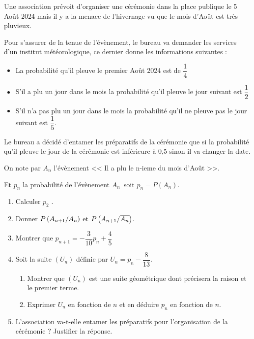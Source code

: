 \begin{exercice}
Une association prévoit d'organiser une cérémonie dans la place publique
le 5 Août 2024 mais il y a la menace de l'hivernage vu que le mois d'Août
est très pluvieux.

Pour s'assurer de la tenue de l'évènement, le bureau va demander les
services d'un institut météorologique, ce dernier donne les informations
suivantes :
\begin{itemize}
\item La probabilité qu'il pleuve le premier Août 2024 est de  $ \dfrac{1}{4} $
\item S'il a plu un jour dans le mois la probabilité qu'il pleuve le jour suivant est $ \dfrac{1}{2} $
\item S’il n'a pas plu un jour dans le mois la probabilité qu’il ne pleuve pas
le jour suivant est $ \dfrac{1}{5} $.
\end{itemize}
Le bureau a décidé d'entamer les préparatifs de la cérémonie que si la
probabilité qu'il pleuve le jour de la cérémonie est inférieure à 0,5 sinon il va
changer la date.

\noindent On note par $ A_n $ l'évènement << Il a plu le n-ieme du mois d'Août >>.

\noindent Et  $ p_n $ la probabilité de l'évènement \; $ A_n $\, soit   $p_n=P(A_n)$.
\begin{enumerate}
\item Calculer $ p_2 $ .
\item  Donner \; $ P \left(A_{n+1} /A_{n}\right) $\;  et \; $ P \left(A_{n+1} /\overline{A_{n}}\right) $.
\item Montrer que \; $ p_{n+1}=-\dfrac{3}{10}p_n +\dfrac{4}{5}$
\item Soit la suite $(U_  n)$ définie par  $U_n=p_n -\dfrac{8}{13}$.
\begin{enumerate}
\item Montrer que $(U_  n)$ est une suite géométrique dont précisera la raison et
le premier terme.
\item Exprimer $U_n$ en fonction de $n$ et en déduire $p_n$ en fonction de $n$.
\end{enumerate}
\item L’association va-t-elle entamer les préparatifs pour l’organisation de la
cérémonie ? Justifier la réponse.
\end{enumerate} 
\end{exercice} 

